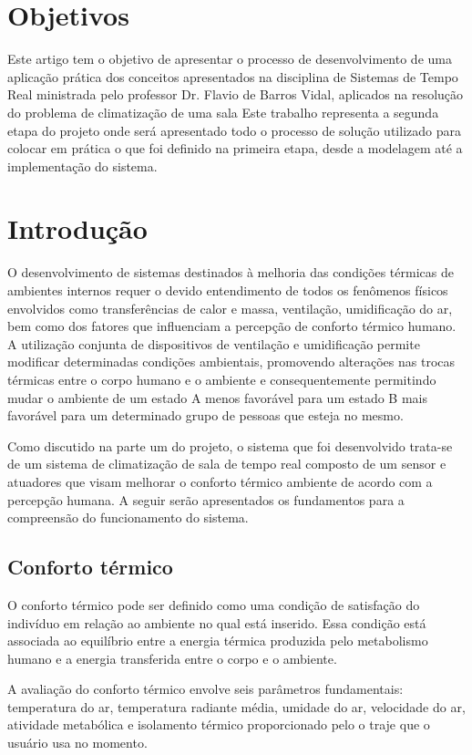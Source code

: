 \documentclass[conference]{IEEEtran}
\begin{document}
\section{Objetivos}
Este artigo tem o objetivo de apresentar o processo de desenvolvimento de uma aplicação prática dos conceitos apresentados na disciplina de Sistemas de Tempo Real ministrada pelo professor Dr. Flavio de Barros Vidal, aplicados na resolução do problema de climatização de uma sala Este trabalho representa a segunda etapa do projeto onde será apresentado todo o processo de solução utilizado para colocar em prática o que foi definido na primeira etapa, desde a modelagem até a implementação do sistema.

\section{Introdução}

O desenvolvimento de sistemas destinados à melhoria das condições térmicas de ambientes internos requer o devido entendimento de todos os fenômenos físicos envolvidos como transferências de calor e massa, ventilação, umidificação do ar, bem como dos fatores que influenciam a percepção de conforto térmico humano. A utilização conjunta de dispositivos de ventilação e umidificação permite modificar determinadas condições ambientais, promovendo alterações nas trocas térmicas entre o corpo humano e o ambiente e consequentemente permitindo mudar o ambiente de um estado A menos favorável para um estado B mais favorável para um determinado grupo de pessoas que esteja no mesmo.

Como discutido na parte um do projeto, o sistema que foi desenvolvido trata-se de um sistema de climatização de sala de tempo real composto de um sensor e atuadores que visam melhorar o conforto térmico ambiente de acordo com a percepção humana. A seguir serão apresentados os fundamentos para a compreensão do funcionamento do sistema.

\subsection{Conforto térmico} 

O conforto térmico pode ser definido como uma condição de satisfação do indivíduo em relação ao ambiente no qual está inserido. Essa condição está associada ao equilíbrio entre a energia térmica produzida pelo metabolismo humano e a energia transferida entre o corpo e o ambiente.

A avaliação do conforto térmico envolve seis parâmetros fundamentais: temperatura do ar, temperatura radiante média, umidade do ar, velocidade do ar, atividade metabólica e isolamento térmico proporcionado pelo o traje que o usuário usa no momento.
\end{document}
